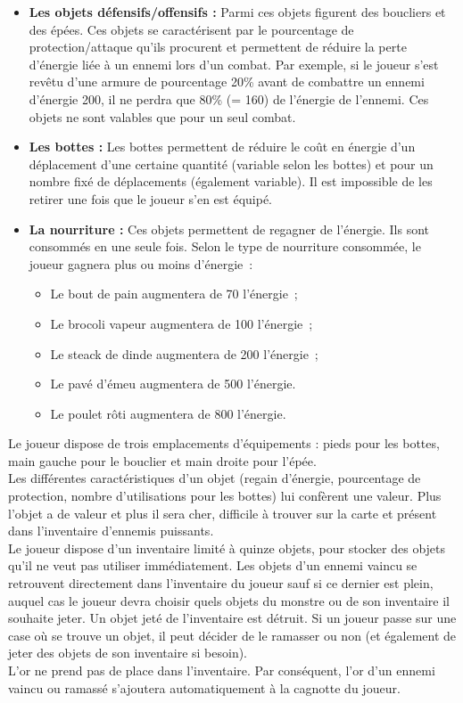 \documentclass[11pt]{article}
\begin{document}
\begin{itemize}
   \item \textbf{Les objets défensifs/offensifs : }Parmi ces objets figurent des boucliers et des épées. Ces objets se caractérisent par le pourcentage de protection/attaque qu'ils procurent et permettent de réduire la perte d'énergie liée à un ennemi lors d'un combat. Par exemple, si le joueur s'est revêtu d'une armure de pourcentage 20\% avant de combattre un ennemi d'énergie 200, il ne perdra que 80\% (= 160) de l'énergie de l'ennemi. Ces objets ne sont valables que pour un seul combat.
   \item \textbf{Les bottes : }Les bottes permettent de réduire le coût en énergie d'un déplacement d'une certaine quantité (variable selon les bottes) et pour un nombre fixé de déplacements (également variable). Il est impossible de les retirer une fois que le joueur s'en est équipé.
   \item \textbf{La nourriture : }Ces objets permettent de regagner de l'énergie. Ils sont consommés en une seule fois. Selon le type de nourriture consommée, le joueur gagnera plus ou moins d'énergie~:
   \begin{itemize}
      \item Le bout de pain augmentera de 70 l'énergie~;
      \item Le brocoli vapeur augmentera de 100 l'énergie~;
      \item Le steack de dinde augmentera de 200 l'énergie~;
      \item Le pavé d'émeu augmentera de 500 l'énergie.
      \item Le poulet rôti augmentera de 800 l'énergie.
   \end{itemize}
\end{itemize}

Le joueur dispose de trois emplacements d'équipements : pieds pour les bottes, main gauche pour le bouclier et main droite pour l'épée. \\
Les différentes caractéristiques d'un objet (regain d'énergie, pourcentage de protection, nombre d'utilisations pour les bottes) lui confèrent une valeur. Plus l'objet a de valeur et plus il sera cher, difficile à trouver sur la carte et présent dans l'inventaire d'ennemis puissants.\\
Le joueur dispose d'un inventaire limité à quinze objets, pour stocker des objets qu'il ne veut pas utiliser immédiatement. Les objets d'un ennemi vaincu se retrouvent directement dans l'inventaire du joueur sauf si ce dernier est plein, auquel cas le joueur devra choisir quels objets du monstre ou de son inventaire il souhaite jeter. Un objet jeté de l'inventaire est détruit. Si un joueur passe sur une case où se trouve un objet, il peut décider de le ramasser ou non (et également de jeter des objets de son inventaire si besoin).\\
L'or ne prend pas de place dans l'inventaire. Par conséquent, l'or d'un ennemi vaincu ou ramassé s'ajoutera automatiquement à la cagnotte du joueur.
\end{document}
